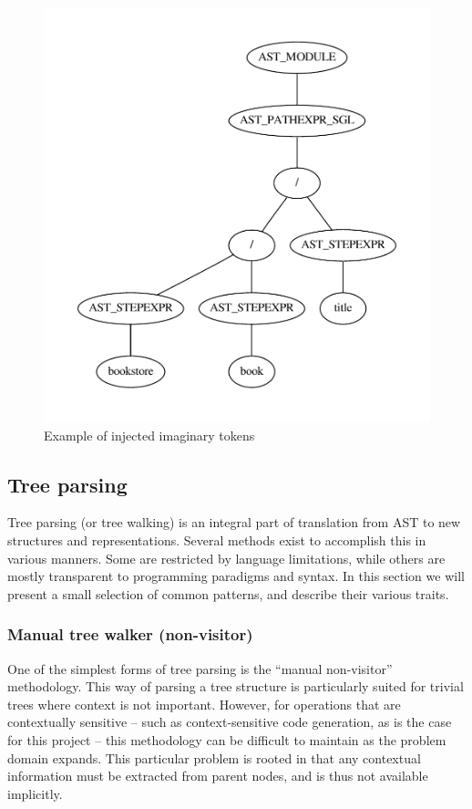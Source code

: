 \begin{figure}[h]
  \centering
    \includegraphics[scale=0.50]{img/graphs/path1} 
  \caption{Example of injected imaginary tokens}
  \label{figure:parser:imaginary_tokens_path}
\end{figure}

\subsection{Tree parsing}
\label{sect:theory:parser:tree_parsing}
Tree parsing (or tree walking) is an integral part of translation from AST to
new structures and representations. Several methods exist to accomplish this in
various manners. Some are restricted by language limitations, while others are
mostly transparent to programming paradigms and syntax. In this section we will
present a small selection of common patterns, and describe their various traits.

\subsubsection{Manual tree walker (non-visitor)}
\label{sect:theory:manual_walker}
One of the simplest forms of tree parsing is the ``manual non-visitor''
methodology. This way of parsing a tree structure is particularly suited for
trivial trees where context is not important. However, for operations that are
contextually sensitive -- such as context-sensitive code generation, as is the
case for this project -- this methodology can be difficult to maintain as the
problem domain expands. This particular problem is rooted in that any
contextual information must be extracted from parent nodes, and is thus not
available implicitly.

